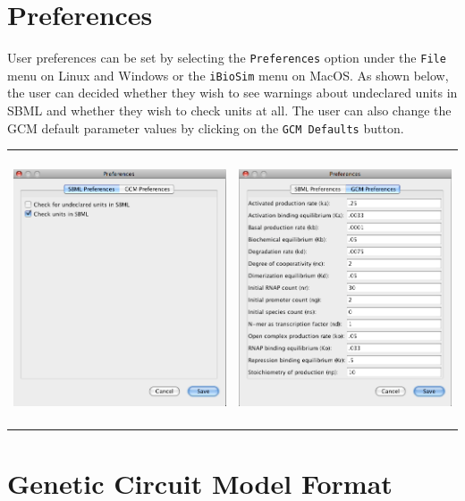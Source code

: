 \documentclass[titlepage,11pt]{article}
\begin{document}
\section{\label{Preferences}Preferences}

\noindent
User preferences can be set by selecting the {\tt Preferences} option
under the {\tt File} menu on Linux and Windows or the {\tt iBioSim} 
menu on MacOS.  As shown below, the user can decided whether they wish
to see warnings about undeclared units in SBML and whether they wish
to check units at all.  The user can also change the GCM default
parameter values by clicking on the {\tt GCM Defaults} button.
\begin{center}
\begin{tabular}{cc}
\includegraphics[height=80mm]{screenshots/SBMLPref} &
\includegraphics[height=80mm]{screenshots/GCMPref}
\end{tabular}
\end{center}

\section{\label{GCM}Genetic Circuit Model Format}
\end{document}
